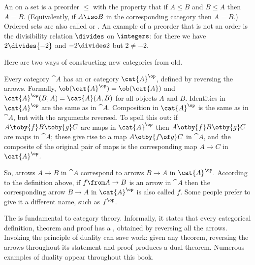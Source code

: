 \begin{examples}
\begin{enumerate}[(b)]
An %
%
%
on a set is a preorder $\leq$ with the property that if $A \leq B$ and $B
\leq A$ then $A = B$.  (Equivalently, if $A \iso B$ in the corresponding
category then $A = B$.)  Ordered sets are also called %
%
%
or .%
%
%
An example of a preorder that is not%
%
%
an order is the divisibility relation $\divides$ on $\integers$: for there
we have $2 \divides {-2}$ and $-2 \divides 2$ but $2 \neq -2$.
\end{enumerate}
\end{examples}

Here are two ways of constructing new categories from old. 

{\sloppy
\begin{constn} 
\label{constn:op-cat}
Every category $\cat{A}$ has an %
%
%
or %
%
%
category $\cat{A}^\op$,%
%
%
defined by reversing the arrows.  Formally, $\ob(\cat{A}^\op) =
\ob(\cat{A})$ and $\cat{A}^\op(B, A) = \cat{A}(A, B)$ for all objects $A$
and $B$.  Identities in $\cat{A}^\op$ are the same as in $\cat{A}$.
Composition in $\cat{A}^\op$ is the same as in $\cat{A}$, but with the
arguments reversed.  To spell this out: if $A \toby{f} B \toby{g} C$ are
maps in $\cat{A}^\op$ then $A \otby{f} B \otby{g} C$ are maps in $\cat{A}$;
these give rise to a map $A \otby{f \of g} C$ in $\cat{A}$, and the
composite of the original pair of maps is the corresponding map $A \to C$
in $\cat{A}^\op$.

So, arrows $A \to B$ in $\cat{A}$ correspond to arrows $B \to A$ in
$\cat{A}^\op$.  According to the definition above, if $f\from A \to B$ is
an arrow in $\cat{A}$ then the corresponding arrow $B \to A$ in
$\cat{A}^\op$ is also called $f$.  Some people prefer to give it a
different name, such as $f^\op$.
\end{constn}
}

\begin{remark}  
\label{rmk:principle-duality}
The %
%
%
is fundamental to category theory.  Informally, it states that every
categorical definition, theorem and proof has a , obtained by
reversing all the arrows.  Invoking the principle of duality can save work:
given any theorem, reversing the arrows throughout its statement and proof
produces a dual theorem.  Numerous examples of duality appear throughout
this book.
\end{remark}

